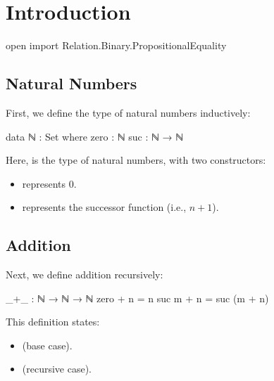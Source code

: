 \chapter{Introduction}

\begin{code}
open import Relation.Binary.PropositionalEquality  
\end{code}

\section{Natural Numbers}
First, we define the type of natural numbers inductively:

\begin{code}
data ℕ : Set where
  zero : ℕ
  suc  : ℕ → ℕ
\end{code}

Here,  is the type of natural numbers, with two constructors:
\begin{itemize}
  \item {} represents 0.
  \item {} represents the successor function (i.e., $n+1$).
\end{itemize}

\section{Addition}
Next, we define addition recursively:

\begin{code}
_+_ : ℕ → ℕ → ℕ
zero  + n = n
suc m + n = suc (m + n)
\end{code}

This definition states:
\begin{itemize}
  \item {} (base case).
  \item {} (recursive case).
\end{itemize}
